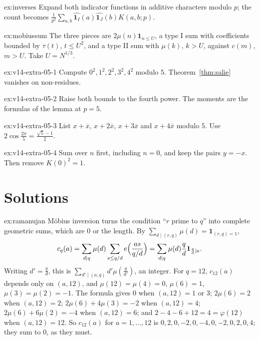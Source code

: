 \begin{hint}{ex:inverses}
Expand both indicator functions in additive characters modulo $p$; the count becomes $\frac1{p^2}\sum_{a,b}\widehat{\mathbf 1_I}(a)\widehat{\mathbf 1_J}(b)K(a,b;p)$.
\end{hint}

\begin{hint}{ex:mobiussum}
The three pieces are $2\mu(n)\mathbf 1_{n\le U}$, a type I sum with coefficients bounded by $\tau(t)$, $t\le U^2$, and a type II sum with $\mu(k)$, $k>U$, against $c(m)$, $m>U$. Take $U=N^{1/3}$.
\end{hint}

\begin{hint}{ex:v14-extra-05-1}
Compute $0^2,1^2,2^2,3^2,4^2$ modulo $5$. Theorem~\ref{thm:salie} vanishes on non-residues.
\end{hint}

\begin{hint}{ex:v14-extra-05-2}
Raise both bounds to the fourth power. The moments are the formulas of the lemma at $p=5$.
\end{hint}

\begin{hint}{ex:v14-extra-05-3}
List $x+\overline x$, $x+2\overline x$, $x+3\overline x$ and $x+4\overline x$ modulo $5$. Use $2\cos\frac{2\pi}5=\frac{\sqrt5-1}2$.
\end{hint}

\begin{hint}{ex:v14-extra-05-4}
Sum over $n$ first, including $n=0$, and keep the pairs $y=-x$. Then remove $K(0)^2=1$.
\end{hint}

\section{Solutions}

\begin{solution}{ex:ramanujan}
\idea Möbius inversion turns the condition ``$r$ prime to $q$'' into complete geometric sums, which are $0$ or the length.
\writeup By $\sum_{d\mid(r,q)}\mu(d)=\mathbf 1_{(r,q)=1}$,
\[
c_q(a)=\sum_{d\mid q}\mu(d)\sum_{s\le q/d}e\Bigl(\frac{as}{q/d}\Bigr)=\sum_{d\mid q}\mu(d)\frac qd\mathbf 1_{\frac qd\mid a}.
\]
Writing $d'=\frac qd$, this is $\sum_{d'\mid(a,q)}d'\mu(\frac q{d'})$, an integer. For $q=12$, $c_{12}(a)$ depends only on $(a,12)$, and $\mu(12)=\mu(4)=0$, $\mu(6)=1$, $\mu(3)=\mu(2)=-1$. The formula gives $0$ when $(a,12)=1$ or $3$; $2\mu(6)=2$ when $(a,12)=2$; $2\mu(6)+4\mu(3)=-2$ when $(a,12)=4$; $2\mu(6)+6\mu(2)=-4$ when $(a,12)=6$; and $2-4-6+12=4=\varphi(12)$ when $(a,12)=12$. So $c_{12}(a)$ for $a=1,\dots,12$ is $0,2,0,-2,0,-4,0,-2,0,2,0,4$; they sum to $0$, as they must.
\end{solution}

